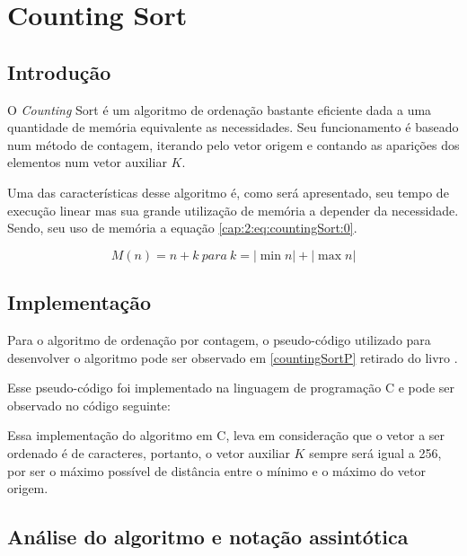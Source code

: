 \section{Counting Sort} \label{cap:2:section:csort}

\subsection{Introdução}

O \textit{Counting} Sort é um algoritmo de ordenação bastante eficiente dada a uma quantidade de
memória equivalente as necessidades. Seu funcionamento é baseado num método de contagem, iterando pelo vetor 
origem e contando as aparições dos elementos num vetor auxiliar $K$.

Uma das características desse algoritmo é, como será apresentado, seu tempo de execução linear mas
sua grande utilização de memória a depender da necessidade. Sendo, seu uso de memória a equação \ref{cap:2:eq:countingSort:0}.

\begin{equation} \label{cap:2:eq:countingSort:0}
    M(n) = n + k \ para \ k = |\min n| + |\max n|
\end{equation}

\subsection{Implementação}

Para o algoritmo de ordenação por contagem, o pseudo-código utilizado para desenvolver o
algoritmo pode ser observado em \ref{countingSortP} retirado do livro \cite{cormen2022algorithms}.



Esse pseudo-código foi implementado na linguagem de programação C 
e pode ser observado no código seguinte:



Essa implementação do algoritmo em C, leva em consideração que o vetor
a ser ordenado é de caracteres, portanto, o vetor auxiliar $K$ sempre será
igual a 256, por ser o máximo possível de distância entre o mínimo e o 
máximo do vetor origem.

\subsection{Análise do algoritmo e notação assintótica}

